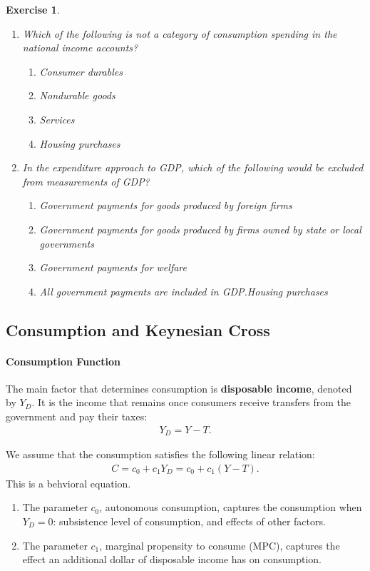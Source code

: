 \documentclass[12pt]{article}
\newtheorem{exercise}{Exercise}
\numberwithin{equation}{section}
\begin{document}
\begin{exercise}
    \begin{enumerate}[label=(\arabic*)]
        \item Which of the following is not a category of consumption spending in the national income accounts?
        \begin{enumerate}[label=\Alph*.]
            \item Consumer durables
            \item Nondurable goods
            \item Services
            \item Housing purchases
        \end{enumerate}
        \item In the expenditure approach to GDP, which of the following would be excluded from measurements of GDP?
        \begin{enumerate}[label=\Alph*.]
            \item Government payments for goods produced by foreign firms
            \item Government payments for goods produced by firms owned by state or local governments
            \item Government payments for welfare 
            \item All government payments are included in GDP.Housing purchases
        \end{enumerate}
    \end{enumerate}
\end{exercise}

\subsection*{Consumption and Keynesian Cross}
\paragraph{Consumption Function}
The main factor that determines consumption is \textbf{disposable income}, denoted by $Y_D$. It is the income that remains once consumers receive transfers from the government and pay their taxes:
\begin{align*}
    Y_D = Y - T.
\end{align*}

We assume that the consumption satisfies the following linear relation:
\begin{align*}
    C = c_0 + c_1 Y_D = c_0 + c_1 (Y-T).
\end{align*}
This is a behvioral equation. 
\begin{enumerate}
    \item The parameter $c_0$, autonomous consumption, captures the consumption when $Y_D=0$: subsistence level of consumption, and effects of other factors.
    \item The parameter $c_1$, marginal propensity to consume (MPC),
    captures the effect an additional dollar of disposable income has on consumption.
\end{enumerate}
\end{document}
